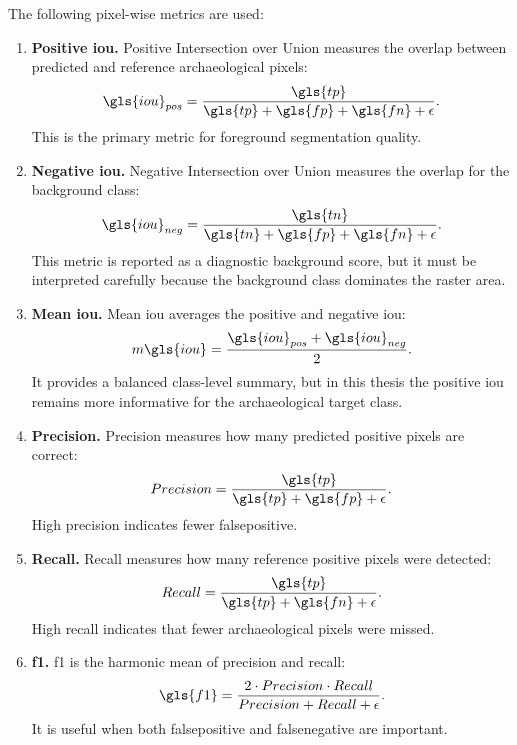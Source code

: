The following pixel-wise metrics are used:
\begin{enumerate}
    \item \textbf{Positive \gls{iou}.} Positive Intersection over Union measures the overlap between predicted and reference archaeological pixels:
    \begin{equation}
        \gls{iou}_{pos} =
        \frac{\gls{tp}}{\gls{tp} + \gls{fp} + \gls{fn} + \epsilon}.
    \end{equation}
    This is the primary metric for foreground segmentation quality.

    \item \textbf{Negative \gls{iou}.} Negative Intersection over Union measures the overlap for the background class:
    \begin{equation}
        \gls{iou}_{neg} =
        \frac{\gls{tn}}{\gls{tn} + \gls{fp} + \gls{fn} + \epsilon}.
    \end{equation}
    This metric is reported as a diagnostic background score, but it must be interpreted carefully because the background class dominates the raster area.

    \item \textbf{Mean \gls{iou}.} Mean \gls{iou} averages the positive and negative \gls{iou}:
    \begin{equation}
        m\gls{iou} =
        \frac{\gls{iou}_{pos} + \gls{iou}_{neg}}{2}.
    \end{equation}
    It provides a balanced class-level summary, but in this thesis the positive \gls{iou} remains more informative for the archaeological target class.

    \item \textbf{Precision.} Precision measures how many predicted positive pixels are correct:
    \begin{equation}
        Precision =
        \frac{\gls{tp}}{\gls{tp} + \gls{fp} + \epsilon}.
    \end{equation}
    High precision indicates fewer \gls{falsepositive}.

    \item \textbf{Recall.} Recall measures how many reference positive pixels were detected:
    \begin{equation}
        Recall =
        \frac{\gls{tp}}{\gls{tp} + \gls{fn} + \epsilon}.
    \end{equation}
    High recall indicates that fewer archaeological pixels were missed.

    \item \textbf{\gls{f1}.} \gls{f1} is the harmonic mean of precision and recall:
    \begin{equation}
        \gls{f1} =
        \frac{2 \cdot Precision \cdot Recall}
        {Precision + Recall + \epsilon}.
    \end{equation}
    It is useful when both \gls{falsepositive} and \gls{falsenegative} are important.
\end{enumerate}

